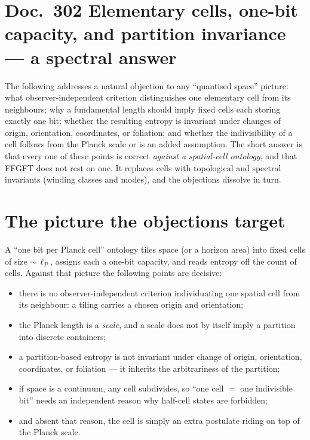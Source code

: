 
\section*{Doc.~302 \quad Elementary cells, one-bit capacity, and partition invariance ---
a spectral answer}

The following addresses a natural objection to any \enquote{quantised space} picture:
what observer-independent criterion distinguishes one elementary cell from its
neighbours; why a fundamental length should imply fixed cells each storing exactly
one bit; whether the resulting entropy is invariant under changes of origin,
orientation, coordinates, or foliation; and whether the indivisibility of a cell
follows from the Planck scale or is an added assumption. The short answer is that
every one of these points is correct \emph{against a spatial-cell ontology}, and that
FFGFT does not rest on one. It replaces cells with topological and spectral invariants (winding classes and modes), and the objections
dissolve in turn.

\section{The picture the objections target}

A \enquote{one bit per Planck cell} ontology tiles space (or a horizon area) into
fixed cells of size ${\sim}\,\ell_P$, assigns each a one-bit capacity, and reads
entropy off the count of cells. Against that picture the following points are
decisive:

\begin{itemize}
\item there is no observer-independent criterion individuating one spatial cell from
its neighbour: a tiling carries a chosen origin and orientation;
\item the Planck length is a \emph{scale}, and a scale does not by itself imply a
partition into discrete containers;
\item a partition-based entropy is not invariant under change of origin, orientation,
coordinates, or foliation --- it inherits the arbitrariness of the partition;
\item if space is a continuum, any cell subdivides, so \enquote{one cell $=$ one
indivisible bit} needs an independent reason why half-cell states are forbidden;
\item and absent that reason, the cell is simply an extra postulate riding on top of
the Planck scale.
\end{itemize}

